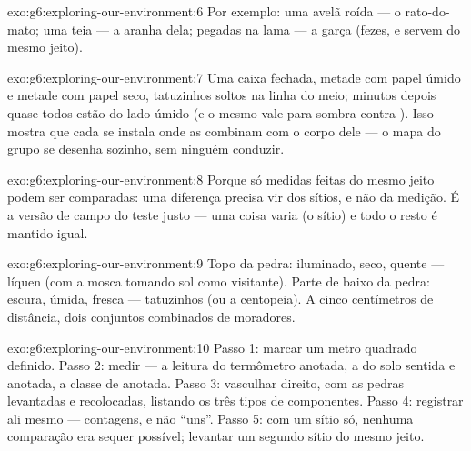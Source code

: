 \begin{solution}{exo:g6:exploring-our-environment:6}
Por exemplo: uma avelã roída --- o rato-do-mato; uma teia --- a
aranha dela; pegadas na lama --- a garça (fezes,  e 
servem do mesmo jeito).
\end{solution}

\begin{solution}{exo:g6:exploring-our-environment:7}
Uma caixa fechada, metade com papel úmido e metade com papel seco,
tatuzinhos soltos na linha do meio; minutos depois quase todos estão
do lado úmido (e o mesmo vale para sombra contra ). Isso mostra
que cada  se instala onde as  combinam com o corpo
dele --- o mapa do grupo se desenha sozinho, sem ninguém conduzir.
\end{solution}

\begin{solution}{exo:g6:exploring-our-environment:8}
Porque só medidas feitas do mesmo jeito podem ser comparadas: uma
diferença precisa vir dos sítios, e não da medição. É a versão de
campo do teste justo --- uma coisa varia (o sítio) e todo o resto é
mantido igual.
\end{solution}

\begin{solution}{exo:g6:exploring-our-environment:9}
Topo da pedra: iluminado, seco, quente --- líquen (com a mosca
tomando sol como visitante). Parte de baixo da pedra: escura, úmida,
fresca --- tatuzinhos (ou a centopeia). A cinco centímetros de
distância, dois conjuntos combinados de moradores.
\end{solution}

\begin{solution}{exo:g6:exploring-our-environment:10}
Passo 1: marcar um metro quadrado definido. Passo 2: medir --- a
leitura do termômetro anotada, a  do solo sentida e anotada,
a classe de  anotada. Passo 3: vasculhar direito, com as pedras
levantadas e recolocadas, listando os três tipos de componentes.
Passo 4: registrar ali mesmo --- contagens, e não ``uns''. Passo 5:
com um sítio só, nenhuma comparação era sequer possível; levantar um
segundo sítio do mesmo jeito.
\end{solution}

